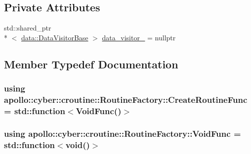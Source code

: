 \subsection*{Private Attributes}
\begin{DoxyCompactItemize}
\item 
std\-::shared\-\_\-ptr\\*
$<$ \hyperlink{classapollo_1_1cyber_1_1data_1_1DataVisitorBase}{data\-::\-Data\-Visitor\-Base} $>$ \hyperlink{classapollo_1_1cyber_1_1croutine_1_1RoutineFactory_a6cb823ff0baa71ccfb349c6087b0a60a}{data\-\_\-visitor\-\_\-} = nullptr
\end{DoxyCompactItemize}


\subsection{Member Typedef Documentation}
\hypertarget{classapollo_1_1cyber_1_1croutine_1_1RoutineFactory_abfe1cf41976441cf3c6189cbc5836b6f}{
\subsubsection[{Create\-Routine\-Func}]{\setlength{\rightskip}{0pt plus 5cm}using {\bf apollo\-::cyber\-::croutine\-::\-Routine\-Factory\-::\-Create\-Routine\-Func} =  std\-::function$<${\bf Void\-Func}()$>$}}\label{classapollo_1_1cyber_1_1croutine_1_1RoutineFactory_abfe1cf41976441cf3c6189cbc5836b6f}
\hypertarget{classapollo_1_1cyber_1_1croutine_1_1RoutineFactory_af7b761ecd3b4662358e3ec7f6d4b7135}{
\subsubsection[{Void\-Func}]{\setlength{\rightskip}{0pt plus 5cm}using {\bf apollo\-::cyber\-::croutine\-::\-Routine\-Factory\-::\-Void\-Func} =  std\-::function$<$void()$>$}}\label{classapollo_1_1cyber_1_1croutine_1_1RoutineFactory_af7b761ecd3b4662358e3ec7f6d4b7135}


